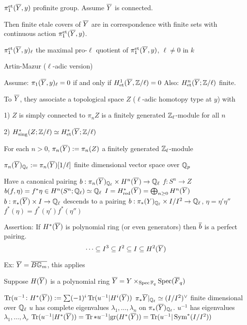 $\pi_1^{\text{et}}(\overline{Y},y)$ profinite group. Assume $\overline{Y}$ is connected.

Then finite etale covers of $\overline{Y}$ are in correspondence with finite sets with continuous action $\pi_1^\text{et}(\overline{Y},y)$.

$\pi_1^\text{et}(\overline{Y},y)_\ell$ the maximal pro-$\ell$ quotient of $\pi_1^\text{et}(\overline{Y},y)$, $\ell \neq 0$ in $k$


Artin-Mazur ($\ell$-adic version)

Assume: $\pi_1(\overline{Y},y)_\ell= 0$ if and only if $H^1_\text{et}(\overline{Y},\mathbb{Z}/\ell)=0$
Also: $H^n_\text{et}(\overline{Y};\mathbb{Z}/\ell)$ finite.

To $\overline{Y}$, they associate a topological space $Z$ ($\ell$-adic homotopy type at $y$) with 

1) $Z$ is simply connected to $\pi_n Z$ is a finitely generated $\mathbb{Z}_\ell$-module for all $n$

2) $H^*_\text{sing}(Z;\mathbb{Z}/\ell) \simeq H^*_\text{et}(\overline{Y}; \mathbb{Z}/\ell)$

For each $n>0$, $\pi_n(\overline{Y}):= \pi_n(Z)$ a finitely generated $\mathbb{Z}_\ell$-module 

$\pi_n(\overline{Y})_{\mathbb{Q}_\ell}:= \pi_n(\overline{Y})[1/\ell]$ finite dimensional vector space over $\mathbb{Q}_p$

Have a canonical pairing $b: \pi_n(\overline{Y})_{\mathbb{Q}_\ell} \times H^n(\overline{Y}) \to \mathbb{Q}_\ell$
$f: S^n \to Z$
$b(f,\eta)= f^*\eta \in H^n(S^n; \mathbb{Q}_\ell) \simeq \mathbb{Q}_\ell$
$I= H^*_\text{red}(\overline{Y})= \bigoplus_{n \geq 0} H^n(\overline{Y})$
$b: \pi_*(\overline{Y}) \times I \to \mathbb{Q}_\ell$
descends to a pairing $b: \pi_*(Y)_{\mathbb{Q}_\ell} \times I/I^2 \to \mathbb{Q}_\ell$, 
$\eta= \eta' \eta''$
$f^*(\eta)= f^*(\eta')f^*(\eta'')$



Assertion: If $H^*(\overline{Y})$ is polynomial ring (or even generators) then $\overline{b}$ is a perfect pairing. 
	\[
	\cdots \subseteq I^3 \subseteq I^2 \subseteq I \subseteq H^2(\overline{Y})
	\]

Ex: $\overline{Y}= \overline{B\mathbb{G}_m}$, this applies


Suppose $H(\overline{Y})$ is a polynomial ring
$\overline{Y}= Y \times_{\operatorname{Spec} \mathbb{F}_q} \operatorname{Spec}(\overline{F}_q)$

$\operatorname{Tr}(u^{-1} \colon H^*(\overline{Y})):= \sum (-1)^i \operatorname{Tr}(u^{-1} | H^i(\overline{Y}))$
$\pi_* \overline{Y}|_{\mathbb{Q}_\ell} \simeq (I/I^2)^\vee$ finite dimensional over $\mathbb{Q}_\ell$
$u$ has complete eigenvalues
$\lambda_1,\ldots,\lambda_n$ on $\pi_*(\overline{Y})_{\mathbb{Q}_\ell}$.
$u^{-1}$ has eigenvalues
$\lambda_1,\ldots,\lambda_r$
$\operatorname{Tr}(u^{-1} | H^*(\overline{Y}))= \operatorname{Tr}*u^{-1} | \text{gr}(H^*(\overline{Y}))= \operatorname{Tr}(u^{-1} | \operatorname{Sym}^*(I/I^2))$

